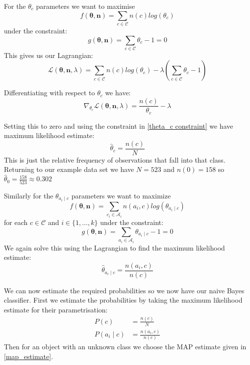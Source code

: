 For the $\theta_c$ parameters we want to maximise
\begin{equation}
	f(\mathbf{\theta}, \mathbf{n}) = \sum_{c \in \mathcal{C}}  n(c)log(\theta_c)
\end{equation}
under the constraint:
\begin{equation}\label{theta_c constraint}
	g(\mathbf{\theta}, \mathbf{n}) = \sum_{c \in \mathcal{C}}  \theta_c - 1 = 0
\end{equation}
This gives us our Lagrangian:
\begin{equation}
	\mathcal{L}(\mathbf{\theta}, \mathbf{n}, \lambda) = \sum_{c \in \mathcal{C}}  n(c)log(\theta_c) - \lambda(\sum_{c \in \mathcal{C}}  \theta_c - 1)
\end{equation}

Differentiating with respect to $\theta_c$ we have:
\begin{equation}
	\nabla_{\theta_c} \mathcal{L}(\mathbf{\theta}, \mathbf{n}, \lambda) = \frac{n(c)}{\theta_c} - \lambda
\end{equation}

Setting this to zero and using the constraint in \cref{theta_c constraint} we have maximum likelihood estimate:
\begin{equation}
	\hat\theta_c = \frac{n(c)}{N}
\end{equation}
This is just the relative frequency of observations that fall into that class.
Returning to our example data set we have $N=523$ and $n(0)=158$ so $\hat\theta_0 = \frac{158}{523} \approx 0.302$

Similarly for the $\theta_{a_i \mid c}$ parameters we want to maximize
\begin{equation}
	f(\mathbf{\theta}, \mathbf{n}) = \sum_{c_i \in \mathcal{A}_i} n(a_i, c) log(\theta_{a_i \mid c})
\end{equation}
for each $c \in \mathcal{C}$ and $i \in \{1,\dots,k\}$ under the constraint:
\begin{equation}
	g(\mathbf{\theta}, \mathbf{n}) = \sum_{a_i \in \mathcal{A}_i}  \theta_{a_i \mid c} - 1 = 0
\end{equation}
We again solve this using the Lagrangian to find the maximum likelihood estimate:
\begin{equation}
	\hat\theta_{a_i \mid c} = \frac{n(a_i, c)}{n(c)}
\end{equation}

We can now estimate the required probabilities so we now have our naive Bayes classifier.
First we estimate the probabilities by taking the maximum likelihood estimate for their parametrisation:
\begin{align}
	P(c) & = \frac{n(c)}{N} \\
	P(a_i \mid c) & = \frac{n(a_i, c)}{n(c)}
\end{align}
Then for an object with an unknown class we choose the MAP estimate given in \cref{map_estimate}.

